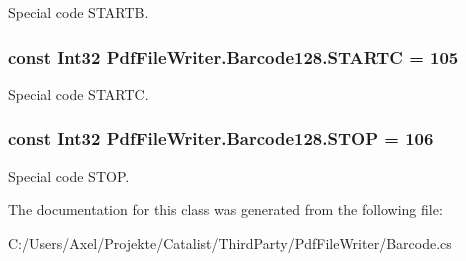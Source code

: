 Special code S\+T\+A\+R\+TB. 

\subsubsection[{\texorpdfstring{S\+T\+A\+R\+TC}{STARTC}}]{\setlength{\rightskip}{0pt plus 5cm}const Int32 Pdf\+File\+Writer.\+Barcode128.\+S\+T\+A\+R\+TC = 105}\hypertarget{class_pdf_file_writer_1_1_barcode128_ac389824c9cfc244f13597ea299c4fec4}{}\label{class_pdf_file_writer_1_1_barcode128_ac389824c9cfc244f13597ea299c4fec4}


Special code S\+T\+A\+R\+TC. 

\subsubsection[{\texorpdfstring{S\+T\+OP}{STOP}}]{\setlength{\rightskip}{0pt plus 5cm}const Int32 Pdf\+File\+Writer.\+Barcode128.\+S\+T\+OP = 106}\hypertarget{class_pdf_file_writer_1_1_barcode128_ab7d5c6442bb38247a30c4cc577ad1ed3}{}\label{class_pdf_file_writer_1_1_barcode128_ab7d5c6442bb38247a30c4cc577ad1ed3}


Special code S\+T\+OP. 



The documentation for this class was generated from the following file\+:\begin{DoxyCompactItemize}
\item 
C\+:/\+Users/\+Axel/\+Projekte/\+Catalist/\+Third\+Party/\+Pdf\+File\+Writer/Barcode.\+cs\end{DoxyCompactItemize}

